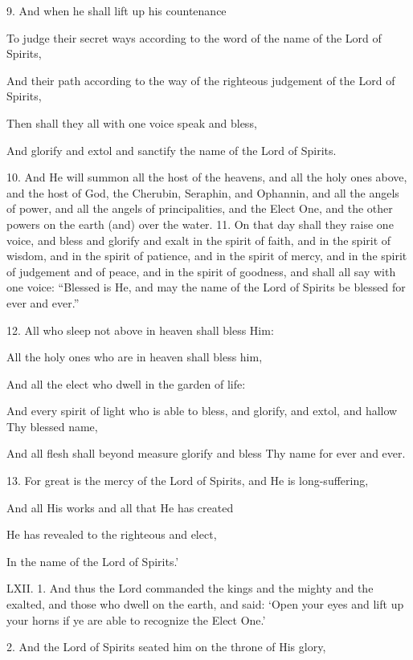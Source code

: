 9. And when he shall lift up his countenance

To judge their secret ways according to the word of the name of the Lord of Spirits,

And their path according to the way of the righteous judgement of the Lord of Spirits,

Then shall they all with one voice speak and bless,

And glorify and extol and sanctify the name of the Lord of Spirits.

10. And He will summon all the host of the heavens,
and all the holy ones above, and the host of God, the
Cherubin, Seraphin, and Ophannin, and all the angels
of power, and all the angels of principalities, and the
Elect One, and the other powers on the earth (and)
over the water. 11. On that day shall they raise one
voice, and bless and glorify and exalt in the spirit
of faith, and in the spirit of wisdom, and in the spirit
of patience, and in the spirit of mercy, and in the
spirit of judgement and of peace, and in the spirit of
goodness, and shall all say with one voice: “Blessed
is He, and may the name of the Lord of Spirits be
blessed for ever and ever.”

12. All who sleep not above in heaven shall bless Him:

All the holy ones who are in heaven shall bless him,

And all the elect who dwell in the garden of life:

And every spirit of light who is able to bless, and glorify, and extol, and hallow Thy blessed name,

And all flesh shall beyond measure glorify and bless Thy name for ever and ever.

13. For great is the mercy of the Lord of Spirits, and He is long-suffering,

And all His works and all that He has created

He has revealed to the righteous and elect,

In the name of the Lord of Spirits.’


LXII. 1. And thus the Lord commanded the kings
and the mighty and the exalted, and those who dwell
on the earth, and said: ‘Open your eyes and lift
up your horns if ye are able to recognize the Elect
One.’

2. And the Lord of Spirits seated him on the throne of His glory,

